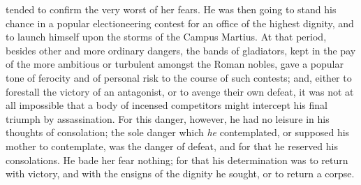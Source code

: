 tended to confirm the very worst of her fears. He was then going to
stand his chance in a popular electioneering contest for an office of
the highest dignity, and to launch himself upon the storms of the Campus
Martius. At that period, besides other and more ordinary dangers, the
bands of gladiators, kept in the pay of the more ambitious or turbulent
amongst the Roman nobles, gave a popular tone of ferocity and of
personal risk to the course of such contests; and, either to forestall
the victory of an antagonist, or to avenge their own defeat, it was not
at all impossible that a body of incensed competitors might intercept
his final triumph by assassination. For this danger, however, he had no
leisure in his thoughts of consolation; the sole danger which \emph{he}
contemplated, or supposed his mother to contemplate, was the danger of
defeat, and for that he reserved his consolations. He bade her fear
nothing; for that his determination was to return with victory, and with
the ensigns of the dignity he sought, or to return a corpse.

